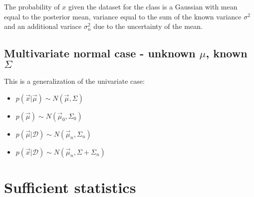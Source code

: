 		The probability of $x$ given the dataset for the class is a Gaussian with mean equal to the posterior mean, variance equal to the sum of the known variance $\sigma^2$ and an additional variace $\sigma^2_n$ due to the uncertainty of the mean.

	\subsection{Multivariate normal case - unknown $\mu$, known $\Sigma$}
	This is a generalization of the univariate case:

	\begin{multicols}{2}
		\begin{itemize}
			\item $p(\vec{x}|\vec{\mu}) \sim N(\vec{\mu}, \Sigma)$
			\item $p(\vec{\mu})\sim N(\vec{\mu}_0, \Sigma_0)$
			\item $p(\vec{\mu}|\mathcal{D}) \sim N(\vec{\mu}_n, \Sigma_n)$
			\item $p(\vec{x}|\mathcal{D}) \sim N(\vec{\mu}_n, \Sigma+\Sigma_n)$
		\end{itemize}
	\end{multicols}

\section{Sufficient statistics}
